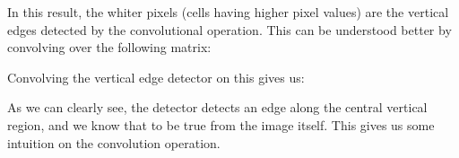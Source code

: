 \documentclass[a4paper, 12pt]{report}
\begin{document}
In this result, the whiter pixels (cells having higher pixel values) are the vertical edges detected by the convolutional operation. This can be understood better by convolving over the following matrix:
\begin{figure}[H]
\centering
{}
\end{figure}
Convolving the vertical edge detector on this gives us:
\begin{figure}[H]
\centering
{}
\end{figure}
As we can clearly see, the detector detects an edge along the central vertical region, and we know that to be true from the image itself. This gives us some intuition on the convolution operation.
\end{document}
